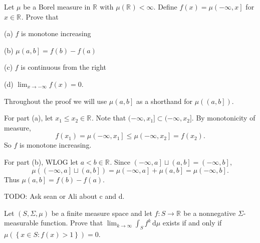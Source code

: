 
\begin{problem}{1}
  Let $\mu$ be a Borel measure in $\mathbb{R}^{}$ with $\mu\left( \mathbb{R}^{} \right) < \infty$.
  Define $f\left( x \right) = \mu\left( - \infty, x  \right]$ for $x \in \mathbb{R}^{}$.
  Prove that

  (a) $f$ is monotone increasing

  (b) $\mu \left( a,b \right] = f\left( b \right) - f\left( a \right)$

  (c) $f$ is continuous from the right

  (d) $\lim_{x \to -\infty} f\left( x  \right) = 0$.
\end{problem}

\begin{solution}
  Throughout the proof we will use $\mu\left( a,b \right]$ as a shorthand for $\mu\left( \left( a,b \right] \right)$.

  For part (a), let $x_{1} \leq x_{2} \in \mathbb{R}^{}$.
  Note that $(-\infty, x_{1}] \subset (-\infty, x_{2}]$.
  By monotonicity of measure,
  \[
    f\left( x_{1} \right) = \mu \left( -\infty, x_{1} \right] \leq \mu \left( -\infty, x_{2} \right] = f\left( x_{2} \right)
  .\] 
  So $f$ is monotone increasing.

  For part (b), WLOG let $a < b \in \mathbb{R}^{}$.
  Since $\left( -\infty, a \right] \sqcup \left( a,b \right] = \left( -\infty,b \right]$, 
  \[
    \mu \left( \left( -\infty, a \right] \sqcup \left( a,b \right] \right) = \mu \left( -\infty, a \right] + \mu \left( a,b \right] = \mu \left( -\infty, b \right]
  .\] 
  Thus $\mu\left( a,b \right] = f\left( b \right) - f\left( a \right)$.

  TODO: Ask sean or Ali about c and d.
\end{solution}

\pagebreak

\begin{problem}{2}
  Let $\left( S, \Sigma, \mu \right)$ be a finite measure space and let $f : S \to \mathbb{R}^{} $ be a nonnegative $\Sigma$-measurable function.
  Prove that $\lim_{k \to \infty} \int_{S} \! f^{k} \, \mathrm{d}\mu $ exists if and only if \\
  $\mu\left( \left\{ x \in S : f(x) > 1 \right\} \right) = 0$.
\end{problem}
    
